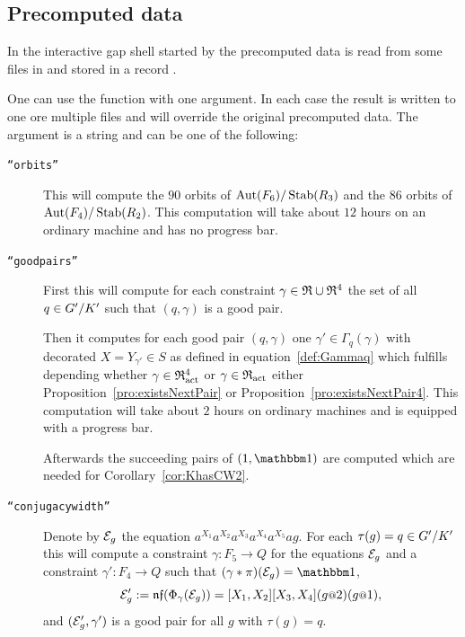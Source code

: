 \documentclass[a4paper,11pt]{amsart}
\begin{document}
\subsection{Precomputed data}\label{sec:precomputation}
In the interactive gap shell started by 
the precomputed data is read from some files in  and stored in 
a record . 

One can use the function  with one argument. In each case
the result is written to one ore multiple files and will override the original precomputed data. 
The argument is a string and can be one of the following:
\begin{description}
    \item [\texttt{``orbits''}] This will compute the $90$ orbits of ${\operatorname{{Aut}}(F_6)/\operatorname{Stab}(R_3)}$ and the
		       $86$ orbits of ${\operatorname{{Aut}}(F_4)/\operatorname{Stab}(R_2)}$. This computation will take
		       about $12$ hours on an ordinary machine and has no progress bar.
   \item [\texttt{``goodpairs''}] First this will compute for each constraint $\gamma\in\mathfrak{R}\cup\mathfrak{R}^4$ 
		      the set of all $q\in{G'/K'}$ such that $(q,\gamma)$ is a good pair.
		      
		      Then it computes for each good pair $(q,\gamma)$ one $\gamma'\in\Gamma_q(\gamma)$
		      with decorated $X=Y_{\gamma'}\in S$ as defined in equation~\ref{def:Gammaq} which 
		      fulfills depending whether $\gamma\in\mathfrak{R}^4_{\operatorname{act}}$ or $\gamma\in\mathfrak{R}_{\operatorname{act}}$ 
		      either Proposition~\ref{pro:existsNextPair} or Proposition~\ref{pro:existsNextPair4}.
		      This computation will take about $2$ hours on ordinary machines and is equipped 
		      with a progress bar. 
		      
		      Afterwards the succeeding pairs of $(1,\id)$ are computed which are needed for 
		      Corollary~\ref{cor:KhasCW2}. 
   \item [\texttt{``conjugacywidth''}] Denote by $\mathcal{E}_g$ the equation $a^{X_1}a^{X_2}a^{X_3}a^{X_4}a^{X_5}ag$.
		      For each $\tau(g)=q\in{G'/K'}$ this will compute a constraint 
		      $\gamma\colon F_5 \to Q$ for the equations $\mathcal{E}_g$
		      and a constraint $\gamma'\colon F_4\to Q$ such that
		      $(\gamma * \pi)(\eq{E}_g) = \id$,
		      \[\eq{E}'_g := \nf(\Phi_\gamma(\eq{E}_g))=[X_1,X_2][X_3,X_4](g\at{2})(g\at{1}),\] and
		      $(\mathcal{E}'_g,\gamma')$ is a good pair for all $g$ with $\tau(g)=q$.
		      

\end{description}
\end{document}
